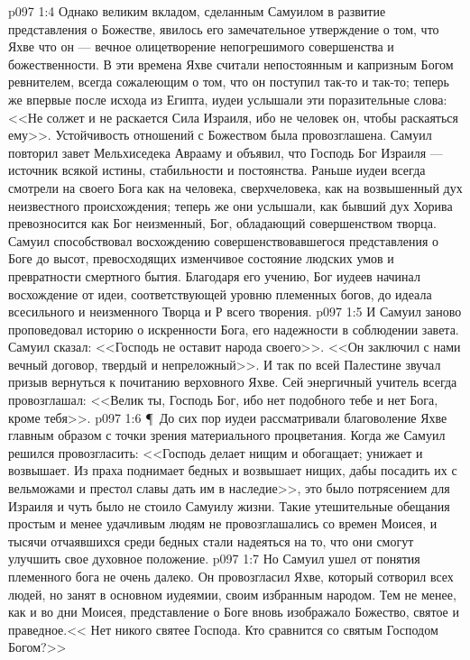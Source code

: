 \vs p097 1:4 Однако великим вкладом, сделанным Самуилом в развитие представления о Божестве, явилось его замечательное утверждение о том, что Яхве  что он --- вечное олицетворение непогрешимого совершенства и божественности. В эти времена Яхве считали непостоянным и капризным Богом ревнителем, всегда сожалеющим о том, что он поступил так\hyp{}то и так\hyp{}то; теперь же впервые после исхода из Египта, иудеи услышали эти поразительные слова: <<Не солжет и не раскается Сила Израиля, ибо не человек он, чтобы раскаяться ему>>. Устойчивость отношений с Божеством была провозглашена. Самуил повторил завет Мельхиседека Аврааму и объявил, что Господь Бог Израиля --- источник всякой истины, стабильности и постоянства. Раньше иудеи всегда смотрели на своего Бога как на человека, сверхчеловека, как на возвышенный дух неизвестного происхождения; теперь же они услышали, как бывший дух Хорива превозносится как Бог неизменный, Бог, обладающий совершенством творца. Самуил способствовал восхождению совершенствовавшегося представления о Боге до высот, превосходящих изменчивое состояние людских умов и превратности смертного бытия. Благодаря его учению, Бог иудеев начинал восхождение от идеи, соответствующей уровню племенных богов, до идеала всесильного и неизменного Творца и Р всего творения.
\vs p097 1:5 И Самуил заново проповедовал историю о искренности Бога, его надежности в соблюдении завета. Самуил сказал: <<Господь не оставит народа своего>>. <<Он заключил с нами вечный договор, твердый и непреложный>>. И так по всей Палестине звучал призыв вернуться к почитанию верховного Яхве. Сей энергичный учитель всегда провозглашал: <<Велик ты, Господь Бог, ибо нет подобного тебе и нет Бога, кроме тебя>>.
\vs p097 1:6 \P\ До сих пор иудеи рассматривали благоволение Яхве главным образом с точки зрения материального процветания. Когда же Самуил решился провозгласить: <<Господь делает нищим и обогащает; унижает и возвышает. Из праха поднимает бедных и возвышает нищих, дабы посадить их с вельможами и престол славы дать им в наследие>>, это было потрясением для Израиля и чуть было не стоило Самуилу жизни. Такие утешительные обещания простым и менее удачливым людям не провозглашались со времен Моисея, и тысячи отчаявшихся среди бедных стали надеяться на то, что они смогут улучшить свое духовное положение.
\vs p097 1:7 Но Самуил ушел от понятия племенного бога не очень далеко. Он провозгласил Яхве, который сотворил всех людей, но занят в основном иудеямии, своим избранным народом. Тем не менее, как и во дни Моисея, представление о Боге вновь изображало Божество, святое и праведное.<< Нет никого святее Господа. Кто сравнится со святым Господом Богом?>>
